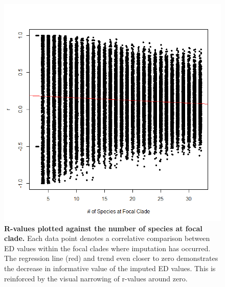 \documentclass[12pt,english]{article}
\begin{document}
\begin{figure}[!ht]
  \center
  \includegraphics[width=\textwidth]{edModel.png}
  \caption{\textbf{R-values plotted against the number of species at focal clade.} 
  Each data point denotes a correlative comparison between ED values within the focal 
  clades where imputation has occurred. The regression line (red) and trend even closer to zero 
  demonstrates the decrease in informative value of the imputed ED values. This is reinforced 
  by the visual narrowing of r-values around zero.}
  \label{imputationTrend}
\end{figure}
\end{document}
